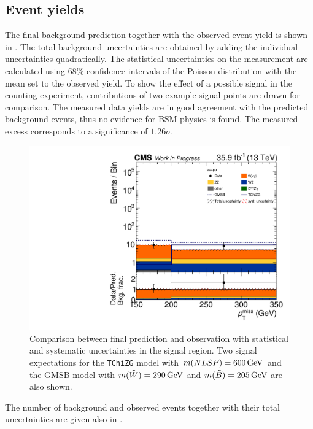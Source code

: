 \subsection{Event yields}
The final background prediction together with the observed event yield is shown in .
The total background uncertainties are obtained by adding the individual uncertainties quadratically. The statistical uncertainties on the measurement are calculated using $68\%$ confidence intervals of the Poisson distribution with the mean set to the observed yield.
To show the effect of a possible signal in the counting experiment, contributions of two example signal points are drawn for comparison. The measured data yields are in good agreement with the predicted background events, thus no evidence for BSM physics is found. The measured excess corresponds to a significance of $1.26\sigma$.
\begin{figure}[tbp]
 \centering
 \includegraphics[width=\pairwidth]{figures/UnblindingPlots/final_MC_log}
 \caption{Comparison between final prediction and observation with statistical and systematic uncertainties in the signal region. Two signal expectations for the \texttt{TChiZG} model with $m(NLSP)=600\,\text{Ge\hspace{-.08em}V}$ and the GMSB model with $m(\tilde{W})=290\,\text{Ge\hspace{-.08em}V}$ and $m(\tilde{B})=205\,\text{Ge\hspace{-.08em}V}$ are also shown.}
 \label{fig:result}
\end{figure}
The number of background and observed events together with their total uncertainties are given also in .
